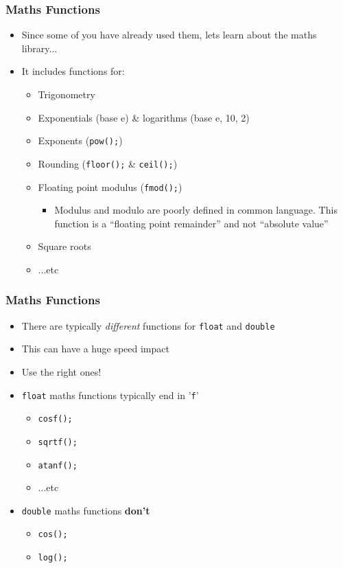 \documentclass[14pt]{beamer}
\begin{document}
\begin{frame}
\frametitle{Maths Functions}
\begin{itemize}
\item Since some of you have already used them, lets learn about the maths library...
\item It includes functions for:
	\begin{itemize}
		\item Trigonometry
		\item Exponentials (base e) \& logarithms (base e, 10, 2)
		\item Exponents (\texttt{pow();})
		\item Rounding (\texttt{floor();} \& \texttt{ceil();})
		\item Floating point modulus (\texttt{fmod();})
			\begin{itemize}
				\item Modulus and modulo are poorly defined in common language. This function is a ``floating point remainder'' and not ``absolute value''
			\end{itemize}
		\item Square roots
		\item ...etc
	\end{itemize}
\end{itemize}
\end{frame}

\begin{frame}
\frametitle{Maths Functions}
\begin{itemize}
\item There are typically \textit{different} functions for \texttt{float} and \texttt{double}
\item This can have a huge speed impact
\item Use the right ones!
\item \texttt{float} maths functions typically end in '\texttt{f}'
	\begin{itemize}
		\item \texttt{cosf();}
		\item \texttt{sqrtf();}
		\item \texttt{atanf();}
		\item ...etc
	\end{itemize}
\item \texttt{double} maths functions \textbf{don't}
	\begin{itemize}
		\item \texttt{cos();}
		\item \texttt{log();}
	\end{itemize}
\end{itemize}
\end{frame}
\end{document}
